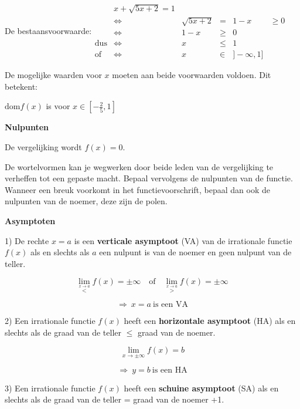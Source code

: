 De bestaansvoorwaarde:${\displaystyle \begin{array}{cccclc}
 & x+\sqrt{5x+2}=1\\
 & \Longleftrightarrow & \sqrt{5x+2} & = & 1-x & \geq0\\
 & \Longleftrightarrow & 1-x & \geq & 0\\
\textrm{dus} & \Longleftrightarrow & x & \leq & 1\\
\textrm{of} & \Longleftrightarrow & x & \in & ]-\infty,1]
\end{array}}$\medskip{}


De mogelijke waarden voor $x$ moeten aan beide voorwaarden voldoen.
Dit betekent:

${\displaystyle \textrm{dom}f(x)}$ is voor $x\in[-\frac{2}{5},1]$ 

\medskip{}


\noindent \textbf{Nulpunten}

De vergelijking wordt $f(x)=0$.

De wortelvormen kan je wegwerken door beide leden van de vergelijking
te verheffen tot een gepaste macht. Bepaal vervolgens de nulpunten
van de functie. Wanneer een breuk voorkomt in het functievoorschrift,
bepaal dan ook de nulpunten van de noemer, deze zijn de polen.

\medskip{}


\noindent \textbf{Asymptoten}

1) De rechte $x=a$ is een \textbf{verticale asymptoot} (VA) van de
irrationale functie $f(x)$ als en slechts als $a$ een nulpunt is
van de noemer en geen nulpunt van de teller.

\[
{\displaystyle {\displaystyle \lim_{\overset{x\rightarrow a}{<}}}f(x)=\pm\infty\quad\textrm{of}\quad{\displaystyle \lim_{\overset{x\rightarrow a}{>}}}f(x)=\pm\infty}
\]


\[
{\displaystyle \Rightarrow\:x=a\:\textrm{is een VA}}
\]
\medskip{}


2) Een irrationale functie $f(x)$ heeft een \textbf{horizontale asymptoot}
(HA) als en slechts als de graad van de teller \ensuremath{\le} graad
van de noemer.

\[
{\displaystyle {\displaystyle \lim_{x\to\pm\infty}}f(x)=b}
\]


\[
{\displaystyle \Rightarrow\:y=b\:\textrm{is een HA}}
\]
\medskip{}


3) Een irrationale functie $f(x)$ heeft een \textbf{schuine asymptoot}
(SA) als en slechts als de graad van de teller = graad van de noemer
+1.

